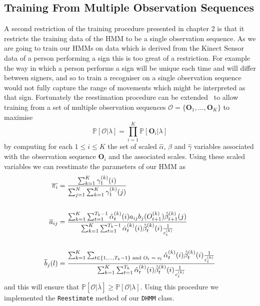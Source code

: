 \subsection{Training From Multiple Observation Sequences}
A second restriction of the training procedure presented in chapter 2 is that it restricts the training data of the HMM to be a single observation sequence. As we are going to train our HMMs on data which is derived from the Kinect Sensor data of a person performing a sign this is too great of a restriction. For example the way in which a person performs a sign will be unique each time and will differ between signers, and so to train a recogniser on a single observation sequence would not fully capture the range of movements which might be interpreted as that sign. Fortunately the reestimation procedure can be extended~\citep{li2000training,vano2010can, rabiner1989tutorial} to allow training from a set of multiple observation sequences $\mathcal{O} =\{\mathbf{O}_1, \dots, \mathbf{O}_{K}\}$ to maximise 
\begin{equation*}
\mathbb{P}[\mathcal{O}|\lambda] = \prod_{i=1}^{K}\mathbb{P}[\mathbf{O}_i|\lambda]
\end{equation*}
by computing for each $1 \leq i \leq K$ the set of scaled $\hat{\alpha}$, $\hat{\beta}$ and $\hat{\gamma}$ variables associated with the observation sequence $\mathbf{O}_i$ and the associated scales. Using these scaled variables we can reestimate the parameters of our HMM as
\begin{align*}
\overline{\pi_i} &= \frac{\sum_{k=1}^{K}\gamma^{(k)}_1(i)}{\sum_{j=1}^{N}\sum_{k=1}^{K}\gamma^{(k)}_1(j)}\\
\vspace{30mm}\\
\overline{a}_{ij} &= \frac{\sum_{k=1}^{K}\sum_{t=1}^{T_k-1}\hat{\alpha}^{(k)}_t(i) a_{ij} b_j(O^{(k)}_{t+1}) \hat{\beta}^{(k)}_{t+1}(j)}{\sum_{k=1}^{K}\sum_{t=1}^{T_k-1}\hat{\alpha}^{(k)}_t(i)\hat{\beta}^{(k)}_t(i)\frac{1}{c^{(k)}_t}}\\
\vspace{30mm}\\
\overline{b}_j(l) &= \frac{\sum_{k=1}^{K}\sum_{t \in \{1,\dots,T_k-1\}\text{ and $O_t = v_l$}}\hat{\alpha}^{(k)}_t(i)\hat{\beta}^{(k)}_t(i)\frac{1}{c^{(k)}_t}}{\sum_{k=1}^{K}\sum_{t=1}^{T_k}\hat{\alpha}^{(k)}_t(i)\hat{\beta}^{(k)}_t(i)\frac{1}{c^{(k)}_t}} \\
\end{align*}
and this will ensure that $\mathbb{P}[\mathcal{O}|\overline{\lambda}] \geq \mathbb{P}[\mathcal{O}|\lambda]$. Using this procedure we implemented the \verb|Reestimate| method of our \verb|DHMM| class.

